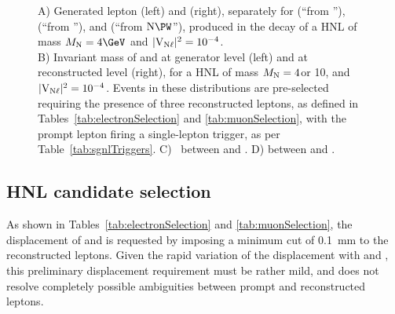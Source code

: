 \begin{figure}[h]
{}
  \caption{A) Generated lepton \pt (left) and \sigeta (right), separately
    for \lone (``from \PW''), \ltwo (``from \hnl''), and \lthree
    (``from $\hnl\PW$''), produced in the decay of a HNL of mass
    $\mhnl=4\GeV$ and $\mathrm{|V_{\mathrm{N}\ell}|^2}=10^{-4}$.\\
B) Invariant mass of \ltwo
    and \lthree 
    at generator level (left) and at reconstructed level (right), for
    a HNL of mass $M_{\mathrm{N}}=4$\GeV or 10\GeV, and $\mathrm{|V_{\mathrm{N}\ell}|^2}=10^{-4}$.
    Events in these distributions are pre-selected requiring the
    presence of three reconstructed leptons, as defined in
    Tables~\ref{tab:electronSelection} and \ref{tab:muonSelection},
    with the prompt lepton firing a single-lepton trigger, as per
    Table~\ref{tab:sgnlTriggers}.
C) \DR\ between \ltwo 
    and \lthree.
D) \Dphi between \lone
    and \lthree.}
  \label{fig:llfeatures}
\end{figure}

\subsection{HNL candidate selection}
As shown in Tables~\ref{tab:electronSelection} and
\ref{tab:muonSelection},
the displacement of \ltwo and \lthree is requested by imposing a
minimum \absdxy cut of 0.1~mm to the reconstructed leptons.
Given the rapid variation of the \hnl displacement with \mhnl and
\mixpar, this preliminary displacement requirement must be rather
mild, and does not resolve completely possible ambiguities between
prompt and \displ reconstructed leptons.

